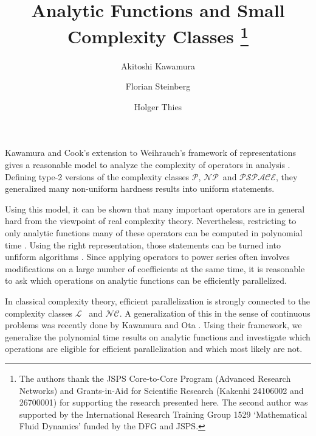\documentclass{llncs}
\newcommand{\p}{\ensuremath{\mathcal P}}
\newcommand{\np}{\ensuremath{\mathcal{NP}}}
\newcommand{\cl}{\ensuremath{\mathcal{L}}}
\newcommand{\nc}{\ensuremath{\mathcal{NC}}}
\newcommand{\pspace}{\ensuremath{ \mathcal{PSPACE}}}
\begin{document}
\title{Analytic Functions and Small Complexity Classes \thanks{The authors thank the JSPS Core-to-Core Program (Advanced Research Networks) and Grants-in-Aid for Scientific Research (Kakenhi 24106002 and 26700001) for supporting the research presented here. The second author was supported by the International Research Training Group 1529 ‘Mathematical Fluid Dynamics’ funded by the DFG and JSPS.}}


\author{Akitoshi Kawamura \and Florian Steinberg \and Holger Thies }

\maketitle

Kawamura and Cook's extension to Weihrauch's framework of representations \cite{Weihrauch} gives a reasonable model to analyze the complexity of operators in analysis \cite{AkiACM}.
Defining type-2 versions of the complexity classes \p, \np~and \pspace, they generalized many non-uniform hardness results into uniform statements.

Using this model, it can be shown that many important operators are in general hard from the viewpoint of real complexity theory. 
Nevertheless, restricting to only analytic functions many of these operators can be computed in polynomial time \cite{MR1137517}.
Using the right representation, those statements can be turned into unfiform algorithms \cite{Kawamura2012}.
Since applying operators to power series often involves modifications on a large number of coefficients at the same time, it is reasonable to ask which operations on analytic functions can be efficiently parallelized.

In classical complexity theory, efficient parallelization is strongly connected to the complexity classes \cl~ and \nc.
A generalization of this in the sense of continuous problems was recently done by Kawamura and Ota \cite{Kawamura2014}.
Using their framework, we generalize the polynomial time results on analytic functions and investigate which operations are eligible for efficient parallelization and which most likely are not.
\end{document}
